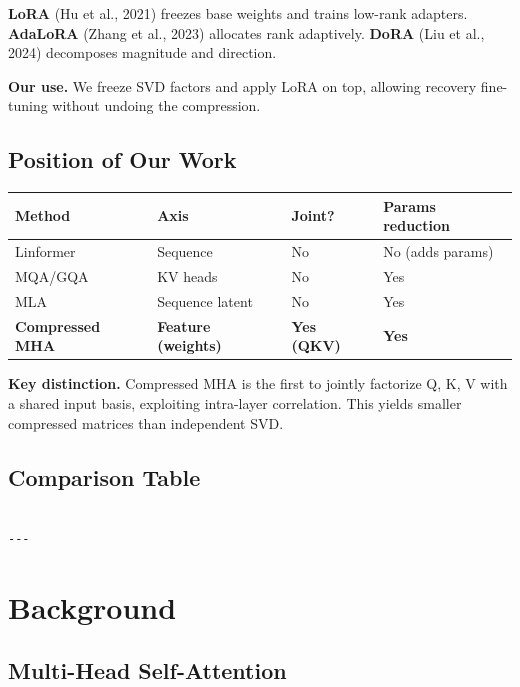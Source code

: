 \textbf{LoRA} (Hu et al., 2021) freezes base weights and trains low-rank adapters. 
\textbf{AdaLoRA} (Zhang et al., 2023) allocates rank adaptively. \textbf{DoRA} (Liu 
et al., 2024) decomposes magnitude and direction.

\textbf{Our use.} We freeze SVD factors and apply LoRA on top, allowing 
recovery fine-tuning without undoing the compression.

\subsection{Position of Our Work}

\begin{table}[H]
\centering
\small
\begin{tabular}{llll}
\toprule
\textbf{Method} & \textbf{Axis} & \textbf{Joint?} & \textbf{Params reduction} \\
\midrule
Linformer & Sequence & No & No (adds params) \\
MQA/GQA & KV heads & No & Yes \\
MLA & Sequence latent & No & Yes \\
\textbf{Compressed MHA} & \textbf{Feature (weights)} & \textbf{Yes (QKV)} & \textbf{Yes} \\
\bottomrule
\end{tabular}
\end{table}

\textbf{Key distinction.} Compressed MHA is the first to jointly factorize Q, K, V 
with a shared input basis, exploiting intra-layer correlation. This yields 
smaller compressed matrices than independent SVD.



\subsection{Comparison Table}

\begin{lstlisting}

---
\end{lstlisting}

\section{Background}

\subsection{Multi-Head Self-Attention}

